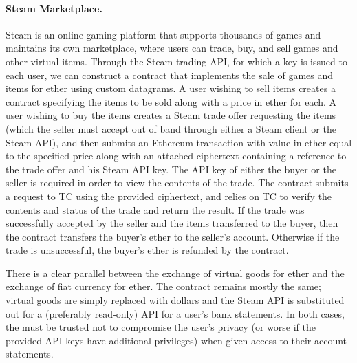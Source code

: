 \paragraph{Steam Marketplace.} Steam  is an online gaming platform that supports thousands of games and maintains its own marketplace, where users can trade, buy, and sell games and other virtual items.  Through the Steam trading API, for which a key is issued to each user, we can construct a contract that implements the sale of games and items for ether using custom datagrams.  A user wishing to sell items creates a contract specifying the items to be sold along with a price in ether for each.  A user wishing to buy the items creates a Steam trade offer requesting the items (which the seller must accept out of band through either a Steam client or the Steam API), and then submits an Ethereum transaction with value in ether equal to the specified price along with an attached ciphertext containing a reference to the trade offer and his Steam API key.  The API key of either the buyer or the seller is required in order to view the contents of the trade.  The contract submits a request to TC using the provided ciphertext, and relies on TC to verify the contents and status of the trade and return the result.  If the trade was successfully accepted by the seller and the items transferred to the buyer, then the contract transfers the buyer's ether to the seller's account.  Otherwise if the trade is unsuccessful, the buyer's ether is refunded by the contract.

There is a clear parallel between the exchange of virtual goods for ether and the exchange of fiat currency for ether.  The contract remains mostly the same; virtual goods are simply replaced with dollars and the Steam API is substituted out for a (preferably read-only) API for a user's bank statements.  In both cases, the \encname must be trusted not to compromise the user's privacy (or worse if the provided API keys have additional privileges) when given access to their account statements.
\fi


